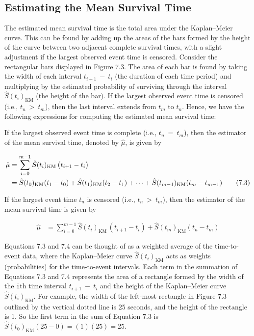 \documentclass[
]{report}
\begin{document}
\hypertarget{estimating-the-mean-survival-time}{%
\subsection*{Estimating the Mean Survival Time}\label{estimating-the-mean-survival-time}}

The estimated mean survival time is the total area under the Kaplan--Meier curve. This can be found by adding up the areas of the bars formed by the height of the curve between two adjacent complete survival times, with a slight adjustment if the largest observed event time is censored. Consider the rectangular bars displayed in Figure 7.3. The area of each bar is found by taking the width of each interval \(\scriptstyle t_{i+1} \ -\  t_i\) (the duration of each time period) and multiplying by the estimated probability of surviving through the interval \(\scriptstyle \hat S(t_i)_{\mathrm{KM}}\) (the height of the bar). If the largest observed event time is censored (i.e., \(\scriptstyle t_n \ >\  t_m\)), then the last interval extends from \(\scriptstyle t_m\) to \(\scriptstyle t_n\). Hence, we have the following expressions for computing the estimated mean survival time:

If the largest observed event time is complete (i.e., \(\scriptstyle t_n \ =\  t_m\)), then the estimator of the mean survival time, denoted by \(\scriptstyle \hat \mu\), is given by

\begin{align}\label{9.3}
\hat \mu 
&= \sum_{i=0}^{m-1} \hat S(t_i)_{\mathrm{KM}} \,\bigl(t_{i+1} - t_i\bigr) \notag \\
&= \hat S(t_0)_{\mathrm{KM}}(t_1 - t_0) + \hat S(t_1)_{\mathrm{KM}}(t_2 - t_1) + \dots + \hat S(t_{m-1})_{\mathrm{KM}}(t_m - t_{m-1})
\tag{7.3}
\end{align}

If the largest event time \(\scriptstyle t_n\) is censored (i.e., \(\scriptstyle t_n \ > \ t_m\)), then the estimator of the mean survival time is given by

\begin{align}\label{9.4}
\hat \mu 
&= \sum_{i=0}^{m-1} \hat S(t_i)_{\mathrm{KM}} \,(t_{i+1} - t_i) + \hat S(t_m)_{\mathrm{KM}}(t_n - t_m)
\tag{7.4}
\end{align}

Equations 7.3 and 7.4 can be thought of as a weighted average of the time-to-event data, where the Kaplan--Meier curve \(\scriptstyle \hat S(t_i)_{\mathrm{KM}}\) acts as weights (probabilities) for the time-to-event intervals. Each term in the summation of Equations 7.3 and 7.4 represents the area of a rectangle formed by the width of the \texttt{i}th time interval \(\scriptstyle t_{i+1} \ -\  t_i\) and the height of the Kaplan--Meier curve \(\scriptstyle \hat S(t_i)_{\mathrm{KM}}\). For example, the width of the left-most rectangle in Figure 7.3 outlined by the vertical dotted line is 25 seconds, and the height of the rectangle is 1. So the first term in the sum of Equation 7.3 is \(\scriptstyle \hat S(t_0)_{\mathrm{KM}}(25 - 0) = (1)(25) = 25\).
\end{document}
